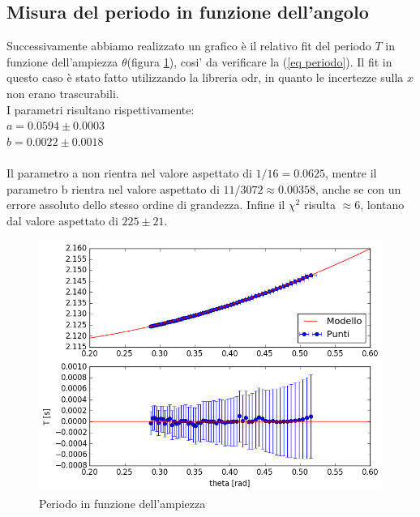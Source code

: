 \documentclass{article}
\begin{document}
		\subsection{Misura del periodo in funzione dell'angolo}
			Successivamente abbiamo realizzato un grafico \`{e} il relativo fit del periodo $T$ in funzione dell'ampiezza $\theta$(figura \ref{fig periodo ampiezza}), cosi' da verificare la (\ref{eq periodo}). Il fit in questo caso \`{e} stato fatto utilizzando la libreria odr, in quanto le incertezze sulla $x$ non erano trascurabili.\\ I parametri risultano rispettivamente:\\$a = 0.0594\pm0.0003$\\$b = 0.0022\pm0.0018$\\\\Il parametro a non rientra nel valore aspettato di $1/16 = 0.0625$, mentre il parametro b rientra nel valore aspettato di $11/3072 \approx 0.00358$, anche se con un errore assoluto dello stesso ordine di grandezza. Infine il $\chi^2$ risulta $\approx 6$, lontano dal valore aspettato di $225\pm21$.
			\begin{figure}
				\centering
				\includegraphics[width=0.7\linewidth]{"Periodo normale 10"}
				\caption{Periodo in funzione dell'ampiezza}
				\label{fig periodo ampiezza}
			\end{figure}
	
\end{document}
